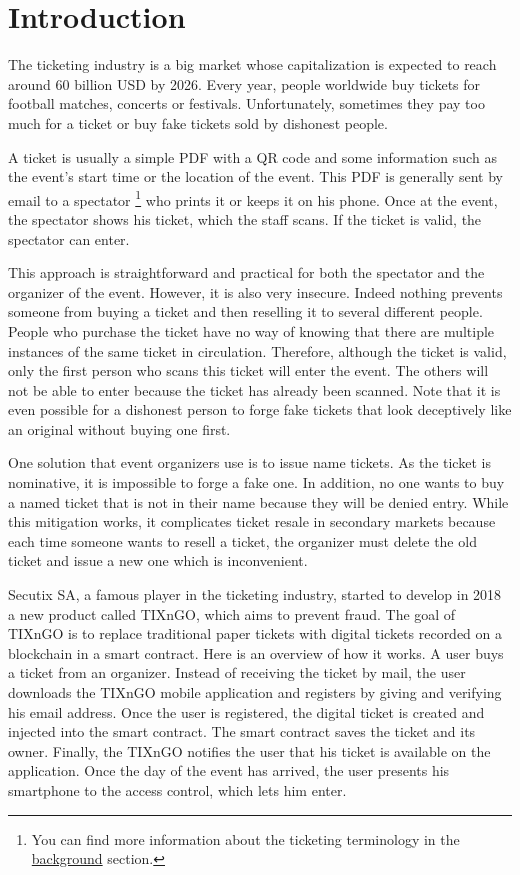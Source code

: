 \documentclass[a4paper,11pt,oneside]{report}
\begin{document}
\maketoc

\chapter{Introduction}
The ticketing industry is a big market whose capitalization is expected to reach around 60 billion USD by 2026. Every year, people worldwide buy tickets for football matches, concerts or festivals. Unfortunately, sometimes they pay too much for a ticket or buy fake tickets sold by dishonest people.

A ticket is usually a simple PDF with a QR code and some information such as the event's start time or the location of the event. This PDF is generally sent by email to a spectator \footnote{You can find more information about the ticketing terminology in the  \hyperref[sec:ticketing_terminology]{background} section.} who prints it or keeps it on his phone. Once at the event, the spectator shows his ticket, which the staff scans. If the ticket is valid, the spectator can enter.

This approach is straightforward and practical for both the spectator and the organizer of the event. However, it is also very insecure. Indeed nothing prevents someone from buying a ticket and then reselling it to several different people. People who purchase the ticket have no way of knowing that there are multiple instances of the same ticket in circulation. Therefore, although the ticket is valid, only the first person who scans this ticket will enter the event. The others will not be able to enter because the ticket has already been scanned. Note that it is even possible for a dishonest person to forge fake tickets that look deceptively like an original without buying one first.

One solution that event organizers use is to issue name tickets. As the ticket is nominative, it is impossible to forge a fake one. In addition, no one wants to buy a named ticket that is not in their name because they will be denied entry. While this mitigation works, it complicates ticket resale in secondary markets because each time someone wants to resell a ticket, the organizer must delete the old ticket and issue a new one which is inconvenient.

Secutix SA, a famous player in the ticketing industry, started to develop in 2018 a new product called TIXnGO, which aims to prevent fraud. The goal of TIXnGO is to replace traditional paper tickets with digital tickets recorded on a blockchain in a smart contract. Here is an overview of how it works. A user buys a ticket from an organizer. Instead of receiving the ticket by mail, the user downloads the TIXnGO mobile application and registers by giving and verifying his email address. Once the user is registered, the digital ticket is created and injected into the smart contract. The smart contract saves the ticket and its owner. Finally, the TIXnGO notifies the user that his ticket is available on the application. Once the day of the event has arrived, the user presents his smartphone to the access control, which lets him enter.
\end{document}
